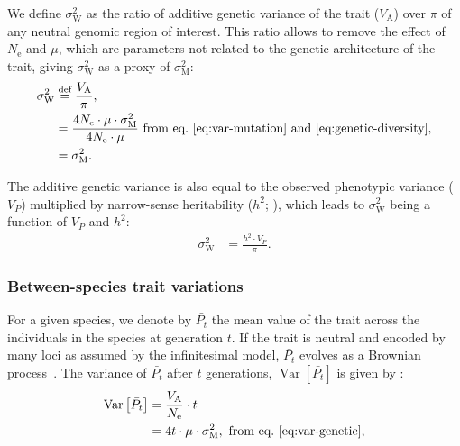 \documentclass{article}
\newcommand{\defEqual}{\stackrel{\text{def}}{=}}
\newcommand{\Multiply}{\cdot}
\DeclareMathOperator{\Var}{\text{Var}}
\newcommand{\Ne}{N_{\text{e}}}
\newcommand{\Time}{t}
\newcommand{\Trait}{P}
\newcommand{\Heritability}{h^2}
\newcommand{\MeanTrait}{\bar{\Trait_{\Time}}}
\newcommand{\VarPhy}{\Var \left[\MeanTrait\right]}
\newcommand{\MutationRate}{\mu}
\newcommand{\VarPhenotype}{V_{\Trait}}
\newcommand{\VarGenetic}{V_{\mathrm{A}}}
\newcommand{\RateMut}{\sigma^2_{\mathrm{M}}}
\newcommand{\RateWhithin}{\sigma^2_{\mathrm{W}}}
\begin{document}
We define $\RateWhithin$ as the ratio of additive genetic variance of the trait ($\VarGenetic$) over $\pi$ of any neutral genomic region of interest.
This ratio allows to remove the effect of $\Ne$ and $\MutationRate$, which are parameters not related to the genetic architecture of the trait, giving $\RateWhithin$ as a proxy of $\RateMut$:
\begin{align}
    \RateWhithin & \defEqual \frac{\VarGenetic }{\pi}, \\
    & = \frac{4 \Ne \Multiply \MutationRate \Multiply \RateMut}{4 \Ne \Multiply \MutationRate} \text{ from eq.~\ref{eq:var-mutation} and~\ref{eq:genetic-diversity}}, \\
    & = \RateMut. \label{eq:rate-pop}
\end{align}

The additive genetic variance is also equal to the observed phenotypic variance ($\VarPhenotype$) multiplied by narrow-sense heritability ($\Heritability$; \parencite{hill_data_2008}), which leads to $\RateWhithin$ being a function of $\VarPhenotype$ and $\Heritability$:
\begin{align}
    \RateWhithin & = \frac{\Heritability \Multiply \VarPhenotype }{\pi }. \label{eq:rate-pheno-pop}
\end{align}

\subsubsection*{Between-species trait variations}

For a given species, we denote by $\MeanTrait$ the mean value of the trait across the individuals in the species at generation $\Time$.
If the trait is neutral and encoded by many loci as assumed by the infinitesimal model, $\MeanTrait$ evolves as a Brownian process~\parencite{felsenstein_phylogenies_1985, hansen_translating_1996}.
The variance of $\MeanTrait$ after $\Time$ generations, $\VarPhy$ is given by \parencite{hansen_translating_1996}:
\begin{align}
    \VarPhy & = \frac{\VarGenetic}{\Ne} \Multiply \Time \\
    & = 4 \Time \Multiply \MutationRate \Multiply \RateMut \label{eq:covar},\text{ from eq.~\ref{eq:var-genetic}},
\end{align}
\end{document}
